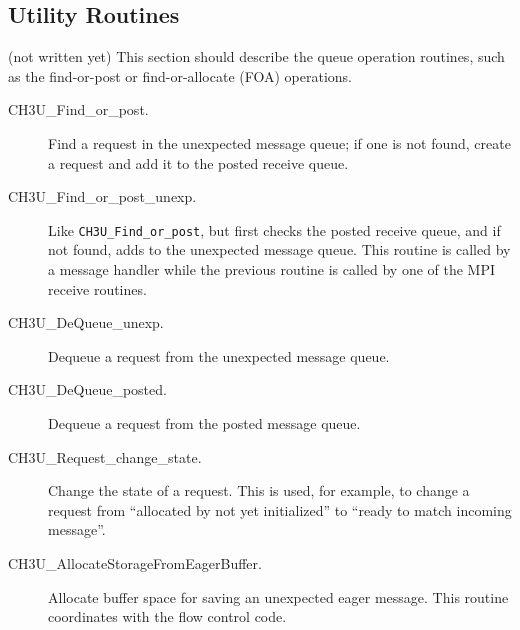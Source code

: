 \documentclass{article}
\def\code{\begingroup\makeustext\eatcode}
\def\eatcode#1{\texttt{#1}\endgroup}
\begin{document}










\subsection{Utility Routines}
(not written yet)
This section should describe the queue operation routines, such as the
find-or-post or find-or-allocate (FOA) operations.



\begin{description}
\item[CH3U\_Find\_or\_post.]Find a request in the unexpected message
queue; if one is 
not found, create a request and add it to the posted receive queue.
\item[CH3U\_Find\_or\_post\_unexp.]Like \code{CH3U\_Find\_or\_post},
but first checks the posted receive queue, and if not found, adds to
the unexpected message queue.  This routine is called by a message
handler while the previous routine is called by one of the MPI receive
routines.  
\item[CH3U\_DeQueue\_unexp.]Dequeue a request from the unexpected
message queue.
\item[CH3U\_DeQueue\_posted.]Dequeue a request from the posted message
queue. 
\item[CH3U\_Request\_change\_state.]Change the state of a request.
This is used, for example, to change a request from ``allocated by not
yet initialized'' to ``ready to match incoming message''.
\item[CH3U\_AllocateStorageFromEagerBuffer.]Allocate buffer space for
saving an unexpected eager message.  This routine coordinates with the
flow control code.
\end{description}
\end{document}
